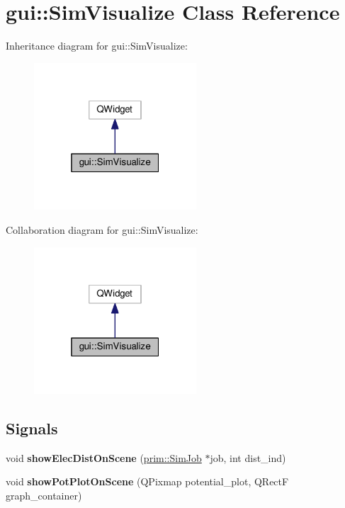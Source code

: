 \hypertarget{classgui_1_1SimVisualize}{}\section{gui\+:\+:Sim\+Visualize Class Reference}
\label{classgui_1_1SimVisualize}


Inheritance diagram for gui\+:\+:Sim\+Visualize\+:\nopagebreak
\begin{figure}[H]
\begin{center}
\leavevmode
\includegraphics[width=172pt]{classgui_1_1SimVisualize__inherit__graph}
\end{center}
\end{figure}


Collaboration diagram for gui\+:\+:Sim\+Visualize\+:\nopagebreak
\begin{figure}[H]
\begin{center}
\leavevmode
\includegraphics[width=172pt]{classgui_1_1SimVisualize__coll__graph}
\end{center}
\end{figure}
\subsection*{Signals}
\begin{DoxyCompactItemize}
\item 
void {\bfseries show\+Elec\+Dist\+On\+Scene} (\hyperlink{classprim_1_1SimJob}{prim\+::\+Sim\+Job} $\ast$job, int dist\+\_\+ind)\hypertarget{classgui_1_1SimVisualize_a9ed2d15112962a71c8a409dcabde46ea}{}\label{classgui_1_1SimVisualize_a9ed2d15112962a71c8a409dcabde46ea}

\item 
void {\bfseries show\+Pot\+Plot\+On\+Scene} (Q\+Pixmap potential\+\_\+plot, Q\+RectF graph\+\_\+container)\hypertarget{classgui_1_1SimVisualize_aafe244f4ea53ce2c06f847bfff561545}{}\label{classgui_1_1SimVisualize_aafe244f4ea53ce2c06f847bfff561545}

\end{DoxyCompactItemize}

